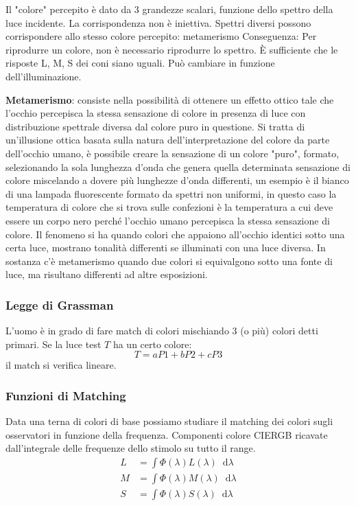 \documentclass[a4paper, 10pt]{article}
\newcommand*\diff{\mathop{}\!\mathrm{d}}
\begin{document}
			\bigskip
			
			Il "colore" percepito è dato da 3 grandezze scalari, funzione
			dello spettro della luce incidente.
			La corrispondenza non è iniettiva. Spettri diversi possono
			corrispondere allo stesso colore percepito: metamerismo
			Conseguenza: Per riprodurre un colore, non è necessario
			riprodurre lo spettro. È sufficiente che le risposte L, M, S dei
			coni siano uguali.
			Può cambiare in funzione dell'illuminazione.
			
			
			\noindent
			\textbf{Metamerismo}: consiste nella possibilità di ottenere un effetto ottico tale che l'occhio percepisca la stessa sensazione di colore in presenza di luce con distribuzione spettrale diversa dal colore puro in questione.
			Si tratta di un'illusione ottica basata sulla natura dell'interpretazione del colore da parte dell'occhio umano, è possibile creare la sensazione di un colore "puro", formato, selezionando la sola lunghezza d'onda che genera quella determinata sensazione di colore miscelando a dovere più lunghezze d'onda differenti, un esempio è il bianco di una lampada fluorescente formato da spettri non uniformi, in questo caso la temperatura di colore che si trova sulle confezioni è la temperatura a cui deve essere un corpo nero perché l'occhio umano percepisca la stessa sensazione di colore.
			Il fenomeno si ha quando colori che appaiono all'occhio identici sotto una certa luce, mostrano tonalità differenti se illuminati con una luce diversa. In sostanza c'è metamerismo quando due colori si equivalgono sotto una fonte di luce, ma risultano differenti ad altre esposizioni.
			\endgroup
		\subsubsection{Legge di Grassman}
			L'uomo è in grado di fare match di colori mischiando 3 (o
			più) colori detti primari. Se la luce test $ T $ ha un certo colore:
			\[
				T = aP1 + bP2 + cP3
			\]
			il match si verifica lineare.
			\vspace{-0.25cm}
			
		\subsubsection{Funzioni di Matching}
			Data una terna di colori di base possiamo studiare il matching
			dei colori sugli osservatori in funzione della frequenza.
			Componenti colore CIERGB ricavate dall'integrale delle
			frequenze dello stimolo su tutto il range.
			\vspace{-0.5cm}
			\begin{align*}
				L &= \int \Phi (\lambda) L (\lambda) \diff\lambda \\
				M &= \int \Phi (\lambda) M (\lambda) \diff\lambda \\
				S &= \int \Phi (\lambda) S (\lambda) \diff\lambda 				
			\end{align*}
			
\end{document}
